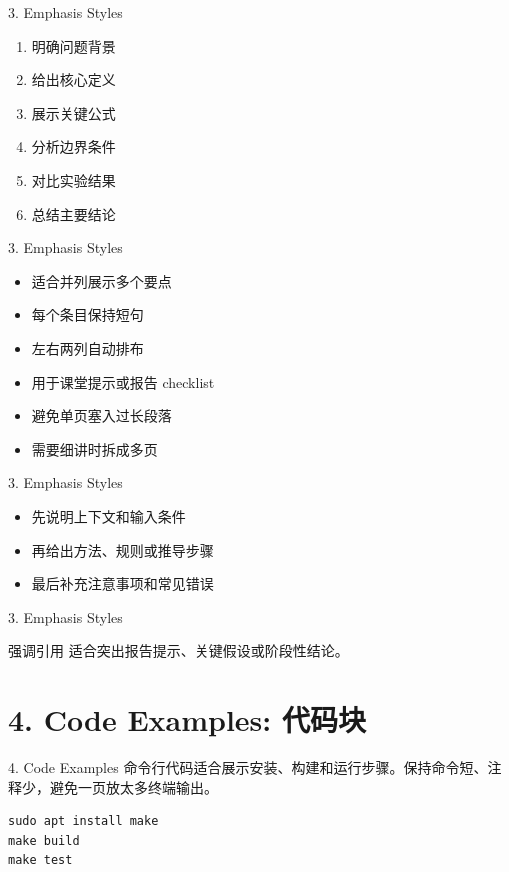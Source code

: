 \documentclass[aspectratio=169,10pt]{beamer}
\begin{document}
\begin{frame}[fragile]{3. Emphasis Styles}
\begin{enumerate}
\def\labelenumi{\arabic{enumi}.}
\item
  明确问题背景
\item
  给出核心定义
\item
  展示关键公式
\item
  分析边界条件
\item
  对比实验结果
\item
  总结主要结论
\end{enumerate}
\end{frame}

\begin{frame}[fragile]{3. Emphasis Styles}
\begin{itemize}
\item
  适合并列展示多个要点
\item
  每个条目保持短句
\item
  左右两列自动排布
\item
  用于课堂提示或报告 checklist
\item
  避免单页塞入过长段落
\item
  需要细讲时拆成多页
\end{itemize}
\end{frame}

\begin{frame}[fragile]{3. Emphasis Styles}
\begin{itemize}
\item
  先说明上下文和输入条件
\item
  再给出方法、规则或推导步骤
\item
  最后补充注意事项和常见错误
\end{itemize}
\end{frame}

\begin{frame}[t,fragile]{3. Emphasis Styles}
\begin{vspquote}{强调引用}
适合突出报告提示、关键假设或阶段性结论。
\end{vspquote}
\end{frame}

\section{4. Code Examples: 代码块}

\begin{frame}[fragile]{4. Code Examples}
命令行代码适合展示安装、构建和运行步骤。保持命令短、注释少，避免一页放太多终端输出。

\begin{verbatim}
sudo apt install make
make build
make test
\end{verbatim}
\end{frame}
\end{document}
